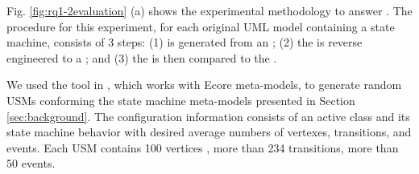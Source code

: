 Fig. \ref{fig:rq1-2evaluation} (a) shows the experimental methodology to answer . 
The procedure for this experiment, for each original UML model containing a state machine, consists of 3 steps: (1)  is generated from an ; (2) the  is reverse engineered to a ; and (3) the  is then compared to the .

We used the tool in \cite{Xiao:2014:RMG:2671850.2671881}, which works with Ecore meta-models, to generate random USMs conforming the state machine meta-models presented in Section \ref{sec:background}. 
The configuration information consists of an active class and its state machine behavior with desired average numbers of vertexes, transitions, and events. 
Each USM contains 100 vertices , more than 234 transitions, more than 50 events. 

